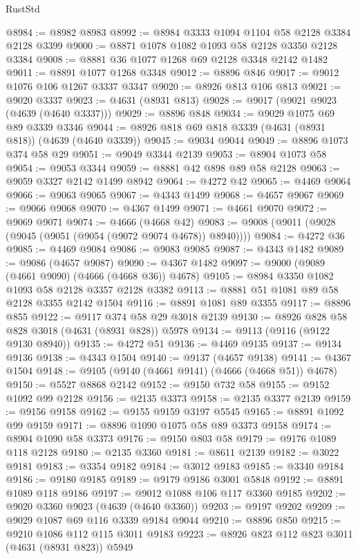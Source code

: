 \begin{lexlean}{RustStd}
\begin{coremodule}
@8984 := @8982 @8983
@8992 := @8984 @3333 @1094 @1104 @58 @2128 @3384 @2128 @3399
@9000 := @8871 @1078 @1082 @1093 @58 @2128 @3350 @2128 @3384
@9008 := @8881 @36 @1077 @1268 @69 @2128 @3348 @2142 @1482
@9011 := @8891 @1077 @1268 @3348
@9012 := @8896 @846
@9017 := @9012 @1076 @106 @1267 @3337 @3347
@9020 := @8926 @813 @106 @813
@9021 := @9020 @3337
@9023 := @4631 (@8931 @813)
@9028 := @9017 (@9021 @9023 (@4639 (@4640 @3337)))
@9029 := @8896 @848
@9034 := @9029 @1075 @69 @89 @3339 @3346
@9044 := @8926 @818 @69 @818 @3339 (@4631 (@8931 @818)) (@4639 (@4640 @3339))
@9045 := @9034 @9044
@9049 := @8896 @1073 @374 @58 @29
@9051 := @9049 @3344 @2139
@9053 := @8904 @1073 @58
@9054 := @9053 @3344
@9059 := @8881 @42 @898 @89 @58 @2128
@9063 := @9059 @3327 @2142 @1499 @8942
@9064 := @4272 @42
@9065 := @4469 @9064
@9066 := @9063 @9065
@9067 := @4343 @1499
@9068 := @4657 @9067
@9069 := @9066 @9068
@9070 := @4367 @1499
@9071 := @4661 @9070
@9072 := @9069 @9071
@9074 := @4666 (@4668 @42)
@9083 := @9008 (@9011 (@9028 (@9045 (@9051 (@9054 (@9072 @9074 @4678)) @8940))))
@9084 := @4272 @36
@9085 := @4469 @9084
@9086 := @9083 @9085
@9087 := @4343 @1482
@9089 := @9086 (@4657 @9087)
@9090 := @4367 @1482
@9097 := @9000 (@9089 (@4661 @9090) (@4666 (@4668 @36)) @4678)
@9105 := @8984 @3350 @1082 @1093 @58 @2128 @3357 @2128 @3382
@9113 := @8881 @51 @1081 @89 @58 @2128 @3355 @2142 @1504
@9116 := @8891 @1081 @89 @3355
@9117 := @8896 @855
@9122 := @9117 @374 @58 @29 @3018 @2139
@9130 := @8926 @828 @58 @828 @3018 (@4631 (@8931 @828)) @5978
@9134 := @9113 (@9116 (@9122 @9130 @8940))
@9135 := @4272 @51
@9136 := @4469 @9135
@9137 := @9134 @9136
@9138 := @4343 @1504
@9140 := @9137 (@4657 @9138)
@9141 := @4367 @1504
@9148 := @9105 (@9140 (@4661 @9141) (@4666 (@4668 @51)) @4678)
@9150 := @5527 @8868 @2142
@9152 := @9150 @732 @58
@9155 := @9152 @1092 @99 @2128
@9156 := @2135 @3373
@9158 := @2135 @3377 @2139
@9159 := @9156 @9158
@9162 := @9155 @9159 @3197 @5545
@9165 := @8891 @1092 @99 @9159
@9171 := @8896 @1090 @1075 @58 @89 @3373 @9158
@9174 := @8904 @1090 @58 @3373
@9176 := @9150 @803 @58
@9179 := @9176 @1089 @118 @2128
@9180 := @2135 @3360
@9181 := @8611 @2139
@9182 := @3022 @9181
@9183 := @3354 @9182
@9184 := @3012 @9183
@9185 := @3340 @9184
@9186 := @9180 @9185
@9189 := @9179 @9186 @3001 @5848
@9192 := @8891 @1089 @118 @9186
@9197 := @9012 @1088 @106 @117 @3360 @9185
@9202 := @9020 @3360 @9023 (@4639 (@4640 @3360))
@9203 := @9197 @9202
@9209 := @9029 @1087 @69 @116 @3339 @9184 @9044
@9210 := @8896 @850
@9215 := @9210 @1086 @112 @115 @3011 @9183
@9223 := @8926 @823 @112 @823 @3011 (@4631 (@8931 @823)) @5949

\end{coremodule}
\end{lexlean}
